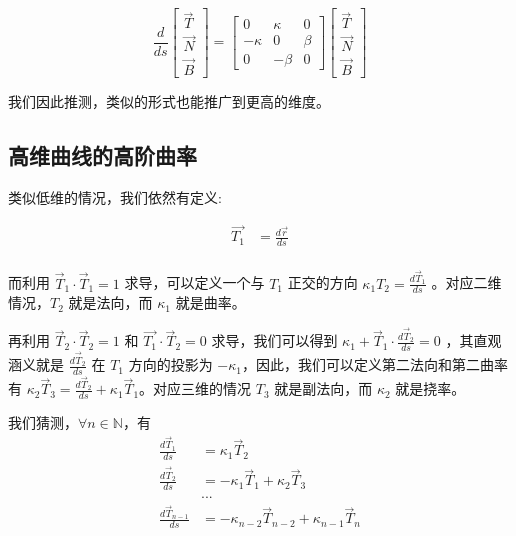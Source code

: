 \documentclass[fontset=windows]{article}
\begin{document}
$$
\frac{d}{ds}
\begin{bmatrix}
    \vec{T} \\
    \vec{N} \\
    \vec{B}
\end{bmatrix} = 
\begin{bmatrix}
    0 & \kappa & 0\\
    -\kappa & 0 & \beta \\
    0 & -\beta & 0
\end{bmatrix}
\begin{bmatrix}
    \vec{T}  \\
    \vec{N}  \\
    \vec{B} 
\end{bmatrix}
$$

我们因此推测，类似的形式也能推广到更高的维度。

\subsection{高维曲线的高阶曲率}

类似低维的情况，我们依然有定义:

$$
\begin{aligned}
    \vec{T_1} &= \frac{d\vec{r}}{ds} \\ 
\end{aligned}
$$

而利用 $\vec{T}_1\cdot\vec{T}_1 = 1$ 求导，可以定义一个与 $T_1$ 正交的方向 ${\kappa_1} T_2 = \frac{d\vec{T}_1}{ds}$ 。对应二维情况，$T_2$ 就是法向，而 $\kappa_1$ 就是曲率。

再利用 $\vec{T}_2\cdot\vec{T}_2 = 1$ 和 $\vec{T_1}\cdot\vec{T}_2 = 0$ 求导，我们可以得到 $\kappa_1 + \vec{T}_1 \cdot \frac{d\vec{T}_2}{ds} = 0 $ ，其直观涵义就是 $\frac{d\vec{T}_2}{ds}$ 在 $T_1$ 方向的投影为 $-\kappa_1$，因此，我们可以定义第二法向和第二曲率有 $\kappa_2 \vec{T}_3 = \frac{d\vec{T}_2}{ds} + \kappa_1 \vec{T}_1$。对应三维的情况 $T_3$ 就是副法向，而 $\kappa_2$ 就是挠率。

我们猜测，$\forall n \in \mathbb{N}$，有
$$
\begin{aligned}    
    \frac{d\vec{T}_1}{ds}   &= \kappa_1 \vec{T}_2 \\
    \frac{d\vec{T}_2}{ds}   &= -\kappa_1 \vec{T}_1  + \kappa_2 \vec{T}_3 \\
    &...\\
    \frac{d\vec{T}_{n-1}}{ds} &= -\kappa_{n-2} \vec{T}_{n-2}  + \kappa_{n-1} \vec{T}_{n} \\
\end{aligned}
$$
\end{document}

